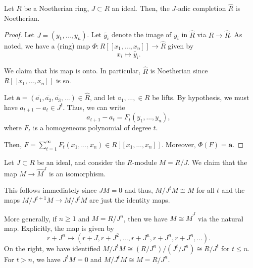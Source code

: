 \documentclass[12pt]{article}
\begin{document}
\begin{thm}
	Let $R$ be a Noetherian ring, $J \subset R$ an ideal. \newline
	Then, the $J$-adic completion $\widehat{R}$ is Noetherian.
\end{thm}
\begin{proof} 
	Let $J = (y_{1}, \ldots, y_{n})$. Let $\widetilde{y_{i}}$ denote the image of $y_{i}$ in $\widehat{R}$ via $R \to \widehat{R}$. \newline
	As noted, we have a (ring) map $\Phi : R[\![x_{1}, \ldots, x_{n}]\!] \to \widehat{R}$ given by
	\begin{equation*} 
		x_{i} \mapsto \widetilde{y_{i}}.
	\end{equation*}

	We claim that his map is onto. In particular, $\widehat{R}$ is Noetherian since $R[\![x_{1}, \ldots, x_{n}]\!]$ is so.

	Let $\mathbf{a} = (\overline{a_{1}}, \overline{a_{2}}, \overline{a_{3}}, \ldots) \in \widehat{R}$, and let $a_{1}, \ldots, \in R$ be lifts. \newline
	By hypothesis, we must have $a_{t + 1} - a_{t} \in J^{t}$. Thus, we can write
	\begin{equation*} 
		a_{t + 1} - a_{t} = F_{t}(y_{1}, \ldots, y_{n}),
	\end{equation*}
	where $F_{t}$ is a homogeneous polynomial of degree $t$. 

	Then, $F = \sum_{t = 1}^{\infty} F_{t}(x_{1}, \ldots, x_{n}) \in R[\![x_{1}, \ldots, x_{n}]\!]$. Moreover, $\Phi(F) = \mathbf{a}$.  
\end{proof}

\begin{ex} \label{ex:J-adic-completion-R-mod-J}
	Let $J \subset R$ be an ideal, and consider the $R$-module $M = R/J$. We claim that the map $M \to \widehat{M}^{J}$ is an isomorphism.

	This follows immediately since $JM = 0$ and thus, $M/J^{t} M \cong M$ for all $t$ and the maps $M/J^{t + 1} M \to M/J^{t} M$ are just the identity maps. 

	More generally, if $n \ge 1$ and $M = R/J^{n}$, then we have $M \cong \widehat{M}^{J}$ via the natural map. Explicitly, the map is given by
	\begin{equation*} 
		r + J^{n} \mapsto (r + J, r + J^{2}, \ldots, r + J^{n}, r + J^{n}, r + J^{n}, \ldots).
	\end{equation*}
	On the right, we have identified $M/J^{t} M \cong (R/J^{n})/(J^{t}/J^{n}) \cong R/J^{t}$ for $t \le n$. For $t > n$, we have $J^{t} M = 0$ and $M/J^{t} M \cong M = R/J^{n}$.
\end{ex}
\end{document}
